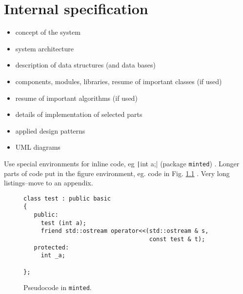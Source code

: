 \chapter{Internal specification}

\begin{itemize}
\item concept of the system
\item system architecture
\item description of data structures (and data bases)
\item components, modules, libraries, resume of important classes (if used)
\item resume of important algorithms (if used)
\item details of implementation of selected parts
\item applied design patterns
\item UML diagrams
\end{itemize}





Use special environments for inline code, eg  %
\texttt|int a;| (package \texttt{minted})
. Longer parts of code put in the figure environment, eg. code in %
Fig. \ref{fig:pseudocode:minted}
. Very long listings–move to an appendix.


\clearpage


\begin{figure}
\centering
\begin{verbatim}
class test : public basic
{
   public:
     test (int a);
     friend std::ostream operator<<(std::ostream & s,
                                    const test & t);
   protected:
     int _a;

};
\end{verbatim}
\caption{Pseudocode in \texttt{minted}.}
\label{fig:pseudocode:minted}
\end{figure}


